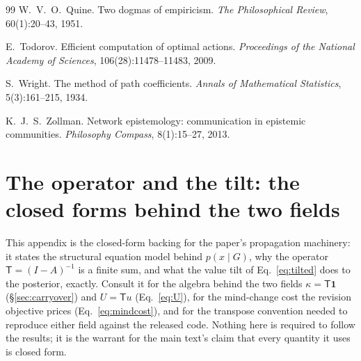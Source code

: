 \documentclass[runningheads]{llncs}
\newcommand{\Top}{\mathsf{T}}          %
\newcommand{\bone}{\mathbf{1}}         %
\begin{document}
\begin{thebibliography}{99}
W.~V.~O.~Quine.
Two dogmas of empiricism.
\emph{The Philosophical Review}, 60(1):20--43, 1951.

E.~Todorov.
Efficient computation of optimal actions.
\emph{Proceedings of the National Academy of Sciences}, 106(28):11478--11483, 2009.

S.~Wright.
The method of path coefficients. \emph{Annals of Mathematical Statistics}, 5(3):161--215, 1934.

K.~J.~S.~Zollman.
Network epistemology: communication in epistemic communities.
\emph{Philosophy Compass}, 8(1):15--27, 2013.

\end{thebibliography}

\clearpage
\appendix
\section{The operator and the tilt: the closed forms behind the two fields}
\label{app:operator}

This appendix is the closed-form backing for the paper's propagation machinery: it states
the structural equation model behind $p(x\mid G)$, why the operator $\Top=(I-A)^{-1}$ is a
finite sum, and what the value tilt of Eq.~\eqref{eq:tilted} does to the posterior, exactly.
Consult it for the algebra behind the two fields $\kappa=\Top\bone$ (\S\ref{sec:carryover}) and
$U=\Top u$ (Eq.~\ref{eq:U}), for the mind-change cost the revision objective prices
(Eq.~\ref{eq:mindcost}), and for the transpose convention needed to reproduce either field
against the released code. Nothing here is required to follow the results; it is the warrant
for the main text's claim that every quantity it uses is closed form.
\end{document}
